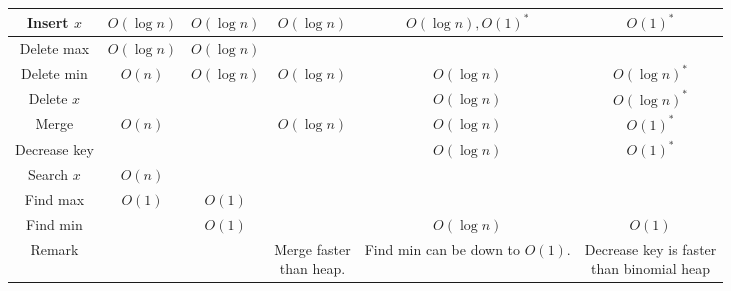 \begin{enumerate}
\begin{table}[H]
\begin{tabular}{|c|c|c|c|c|c|}
            \Xhline{2\arrayrulewidth}
            Insert $x$ & $O(\log n)$ & $O(\log n)$ & $O(\log n)$ & $O(\log n), O(1)^*$ & $O(1)^*$ \\
            \hline
            Delete max & $O(\log n)$ & $O(\log n)$ & & & \\
            \hline
            Delete min & $O(n)$ & $O(\log n)$ & $O(\log n)$ & $O(\log n)$ & $O(\log n)^*$ \\
            \hline
            Delete $x$ & & & & $O(\log n)$ & $O(\log n)^*$ \\
            \hline
            Merge & $O(n)$ & & $O(\log n)$ & $O(\log n)$ & $O(1)^*$ \\
            \hline
            Decrease key & & & & $O(\log n)$ & $O(1)^*$ \\
            \hline
            Search $x$ & $O(n)$ & & & & \\
            \hline
            Find max & $O(1)$ & $O(1)$ & & & \\
            \hline
            Find min & & $O(1)$ & & $O(\log n)$ & $O(1)$ \\
            \hline
            Remark & & & \makecell{Merge faster\\than heap.} & \makecell{Find min can be\\down to $O(1)$.} & \makecell{Decrease key is faster\\than binomial heap} \\
            \hline
        \end{tabular}
    \end{table} 
\end{enumerate}

\pagebreak